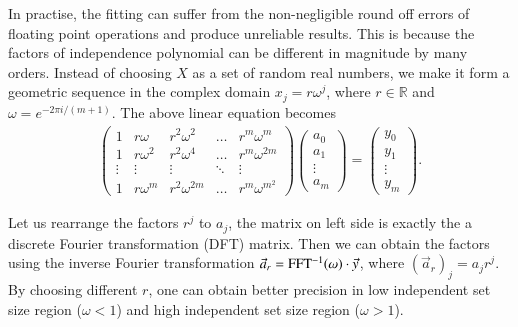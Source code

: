 \documentclass[review,onefignum,onetabnum]{siamart190516}
\newcommand{\<}{\langle}
\renewcommand{\>}{\rangle}
\begin{document}
In practise, the fitting can suffer from the non-negligible round off errors of floating point operations and produce unreliable results.
This is because the factors of independence polynomial can be different in magnitude by many orders.
Instead of choosing $X$ as a set of random real numbers, we make it form a geometric sequence in the complex domain $x_j = r\omega^j$, where $r \in \mathbb{R}$ and $\omega = e^{-2\pi i/(m+1)}$. The above linear equation becomes
\begin{align}
\left(\begin{matrix}
1 & r\omega & r^2\omega^2 & \ldots & r^m\omega^m \\
1 & r\omega^2 & r^2\omega^4 & \ldots & r^m\omega^{2m} \\
\vdots & \vdots & \vdots &\ddots & \vdots \\
1 & r\omega^m & r^2\omega^{2m} & \ldots & r^m\omega^{m^2}
\end{matrix}\right)
\left(\begin{matrix}
a_0 \\ a_1 \\ \vdots \\ a_m
\end{matrix}\right)
= \left(\begin{matrix}
y_0 \\ y_1 \\ \vdots \\ y_m
\end{matrix}\right).
\end{align}

Let us rearrange the factors $r^j$ to $a_j$, the matrix on left side is exactly the a discrete Fourier transformation (DFT) matrix.
Then we can obtain the factors using the inverse Fourier transformation $\vec a_r = {\rm FFT^{-1}}(\omega) \cdot \vec y$, where $(\vec a_r)_j = a_j r ^j$.
By choosing different $r$, one can obtain better precision in low independent set size region  ($\omega<1$) and high independent set size region ($\omega>1$).
\end{document}
